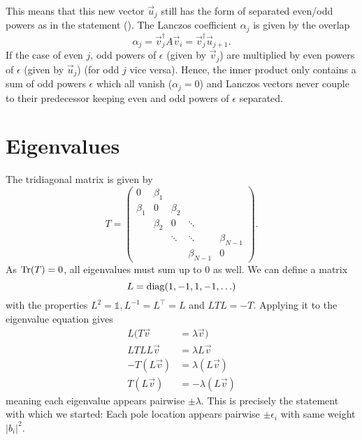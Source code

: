 This means that this new vector $\vec{u}_j$ still has the form of separated even/odd powers
as in the statement ().
The Lanczos coefficient $\alpha_j$ is given by the overlap
\begin{equation}
    \alpha_j
    =
    \vec{v}_j^\dagger A \vec{v}_i
    =
    \vec{v}_j^\dagger \vec{u}_{j+1}.
\end{equation}
If the case of even $j$, odd powers of $\epsilon$ (given by $\vec{v}_j$)
are multiplied by even powers of $\epsilon$ (given by $\vec{u}_j$)
(for odd $j$ vice versa).
Hence, the inner product only contains a sum of odd powers $\epsilon$ which all vanish
($\alpha_j = 0$)
and Lanczos vectors never couple to their predecessor
keeping even and odd powers of $\epsilon$ separated.

\section{Eigenvalues}

The tridiagonal matrix is given by
\begin{equation}
    T
    =
    \begin{pmatrix}
        0       & \beta_1 &         &             &             \\
        \beta_1 & 0       & \beta_2 &             &             \\
                & \beta_2 & 0       & \ddots      &             \\
                &         & \ddots  & \ddots      & \beta_{N-1} \\
                &         &         & \beta_{N-1} & 0
    \end{pmatrix}.
\end{equation}
As $\operatorname{Tr}(T) = 0$, all eigenvalues must sum up to $0$ as well.
We can define a matrix
\begin{equation}
    L = \operatorname{diag}(1, -1, 1, -1, \ldots)
\end{equation}
with the properties $L^2 = \mathbb{1}, L^{-1} = L^\intercal = L$ and $L T L = -T$.
Applying it to the eigenvalue equation gives
\begin{align}
    L(T \vec{v}   & = \lambda \vec{v})    \\
    LT LL\vec{v}  & = \lambda L\vec{v}    \\
    -T (L\vec{v}) & = \lambda (L\vec{v})  \\
    T (L\vec{v})  & = -\lambda (L\vec{v})
\end{align}
meaning each eigenvalue appears pairwise $\pm\lambda$.
This is precisely the statement with which we started:
Each pole location appears pairwise $\pm\epsilon_i$ with same weight $|b_i|^2$.
